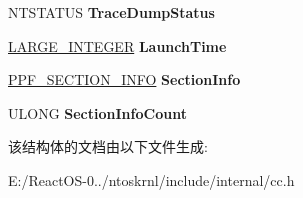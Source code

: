 \begin{DoxyCompactItemize}
\item 
\mbox{\label{struct___p_f_s_n___t_r_a_c_e___h_e_a_d_e_r_ab81d7c8c515ca4d3d81426d6256bbca2}} 
N\+T\+S\+T\+A\+T\+US {\bfseries Trace\+Dump\+Status}
\item 
\mbox{\label{struct___p_f_s_n___t_r_a_c_e___h_e_a_d_e_r_a958aa935281df4d74834958906965bc3}} 
\hyperlink{union___l_a_r_g_e___i_n_t_e_g_e_r}{L\+A\+R\+G\+E\+\_\+\+I\+N\+T\+E\+G\+ER} {\bfseries Launch\+Time}
\item 
\mbox{\label{struct___p_f_s_n___t_r_a_c_e___h_e_a_d_e_r_a6207dd39aa13645641f49e2f0db7da1a}} 
\hyperlink{struct___p_f___s_e_c_t_i_o_n___i_n_f_o}{P\+P\+F\+\_\+\+S\+E\+C\+T\+I\+O\+N\+\_\+\+I\+N\+FO} {\bfseries Section\+Info}
\item 
\mbox{\label{struct___p_f_s_n___t_r_a_c_e___h_e_a_d_e_r_ab8760bfd4646d7ae694a58feee1862e1}} 
U\+L\+O\+NG {\bfseries Section\+Info\+Count}
\end{DoxyCompactItemize}


该结构体的文档由以下文件生成\+:\begin{DoxyCompactItemize}
\item 
E\+:/\+React\+O\+S-\/0../ntoskrnl/include/internal/cc.\+h\end{DoxyCompactItemize}
